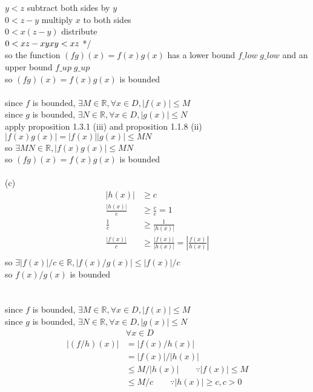 \documentclass[12pt, border = 4pt, multi]{article} %
\begin{document}
$y < z$ \qquad subtract both sides by $y$\\
$0 < z - y$ \qquad multiply $x$ to both sides\\
$0 < x(z - y)$ \qquad distribute\\
$0 < xz - xy\\
xy < xz$ */\\
so the function $(fg)(x) = f(x)g(x)$ has a lower bound $f\_low\;g\_low$ and an upper bound $f\_up\;g\_up$\\
so $(fg)(x) = f(x)g(x)$ is bounded\\
\\
since $f$ is bounded, $\exists M \in \mathbb{R}, \forall x \in D, |f(x)| \leq M$\\
since $g$ is bounded, $\exists N \in \mathbb{R}, \forall x \in D, |g(x)| \leq N$\\
apply proposition 1.3.1 (iii) and proposition 1.1.8 (ii)\\
$|f(x)g(x)| = |f(x)||g(x)| \leq MN$\\
so $\exists MN \in \mathbb{R}, |f(x)g(x)| \leq MN$\\
so $(fg)(x) = f(x)g(x)$ is bounded\\
\\
(c)
\begin{align*}
|h(x)| &\geq c\\
\frac{|h(x)|}{c} &\geq \frac{c}{c} = 1\\
\frac{1}{c} &\geq \frac{1}{|h(x)|}\\
\frac{|f(x)|}{c} &\geq \frac{|f(x)|}{|h(x)|} =\left|\frac{f(x)}{h(x)}\right|\\
\end{align*}
so $\exists |f(x)| / c \in \mathbb{R}, |f(x) / g(x)| \leq |f(x)| / c$\\
so $f(x) / g(x)$ is bounded\\
\\
\\
since $f$ is bounded, $\exists M \in \mathbb{R}, \forall x \in D, |f(x)| \leq M$\\
since $g$ is bounded, $\exists N \in \mathbb{R}, \forall x \in D, |g(x)| \leq N$\\
\begin{align*}
&\forall x \in D\\
|(f / h)(x)| &= |f(x) / h(x)|\\
&= |f(x)| / |h(x)|\\
&\leq M / |h(x)| \qquad \because |f(x)| \leq M\\
&\leq M / c \qquad \because |h(x)| \geq c, c > 0
\end{align*}
\end{document}
